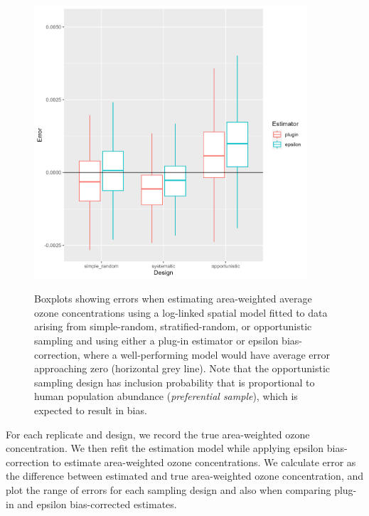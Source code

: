 \begin{figure}[!ht]
    \caption[Errors in simulation experiment with alternative sampling designs]{Boxplots showing errors when estimating area-weighted average ozone concentrations using a log-linked spatial model fitted to data arising from simple-random, stratified-random, or opportunistic sampling and using either a plug-in estimator or epsilon bias-correction, where a well-performing model would have average error approaching zero (horizontal grey line). Note that the opportunistic sampling design has inclusion probability that is proportional to human population abundance (\textit{preferential sample}), which is expected to result in bias.}
    \centering
    \includegraphics[width=4in]{Chap_6/Design_errors.png}
    \label{fig:Chap6_design_errors}
\end{figure}

For each replicate and design, we record the true area-weighted ozone concentration.  We then refit the estimation model while applying epsilon bias-correction to estimate area-weighted ozone concentrations.  We calculate error as the difference between estimated and true area-weighted ozone concentration, and plot the range of errors for each sampling design and also when comparing plug-in and epsilon bias-corrected estimates.  


